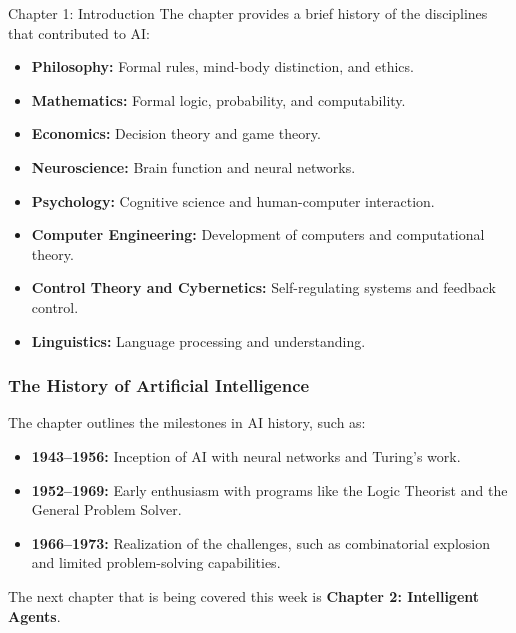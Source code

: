 \begin{notes}{Chapter 1: Introduction}
    The chapter provides a brief history of the disciplines that contributed to AI:
    \begin{itemize}
        \item \textbf{Philosophy:} Formal rules, mind-body distinction, and ethics.
        \item \textbf{Mathematics:} Formal logic, probability, and computability.
        \item \textbf{Economics:} Decision theory and game theory.
        \item \textbf{Neuroscience:} Brain function and neural networks.
        \item \textbf{Psychology:} Cognitive science and human-computer interaction.
        \item \textbf{Computer Engineering:} Development of computers and computational theory.
        \item \textbf{Control Theory and Cybernetics:} Self-regulating systems and feedback control.
        \item \textbf{Linguistics:} Language processing and understanding.
    \end{itemize}

    \subsubsection*{The History of Artificial Intelligence}

    The chapter outlines the milestones in AI history, such as:
    \begin{itemize}
        \item \textbf{1943–1956:} Inception of AI with neural networks and Turing's work.
        \item \textbf{1952–1969:} Early enthusiasm with programs like the Logic Theorist and the General Problem Solver.
        \item \textbf{1966–1973:} Realization of the challenges, such as combinatorial explosion and limited problem-solving capabilities.
    \end{itemize}
\end{notes}

The next chapter that is being covered this week is \textbf{Chapter 2: Intelligent Agents}.

